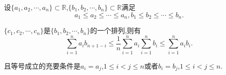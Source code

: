 \documentclass[../../main.tex]{subfiles}
\begin{document}
\begin{theorem}[Chebeshev不等式]\label{theorem:Chebeshev不等式}
设\(\{a_1,a_2,\cdots,a_n\} \subset \mathbb{R}\),\(\{b_1,b_2,\cdots,b_n\} \subset \mathbb{R}\)满足
\[
a_1 \leqslant  a_2 \leqslant  \cdots \leqslant  a_n, b_1 \leqslant  b_2 \leqslant  \cdots \leqslant  b_n.
\]

\(\{c_1,c_2,\cdots,c_n\}\)是\(\{b_1,b_2,\cdots,b_n\}\)的一个排列,则有
\[
\sum\limits_{i = 1}^{n} a_i b_{n + 1 - i} \leqslant  \frac{1}{n} \sum\limits_{i = 1}^{n} a_i \sum\limits_{i = 1}^{n} b_i \leqslant  \sum\limits_{i = 1}^{n} a_i b_i.
\]

且等号成立的充要条件是\(a_i = a_j\),\(1 \leqslant  i < j \leqslant  n\)或者\(b_i = b_j\),\(1 \leqslant  i < j \leqslant  n\).
\end{theorem}
\end{document}
